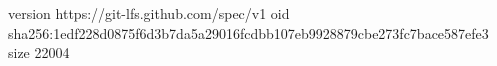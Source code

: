 version https://git-lfs.github.com/spec/v1
oid sha256:1edf228d0875f6d3b7da5a29016fcdbb107eb9928879cbe273fc7bace587efe3
size 22004
